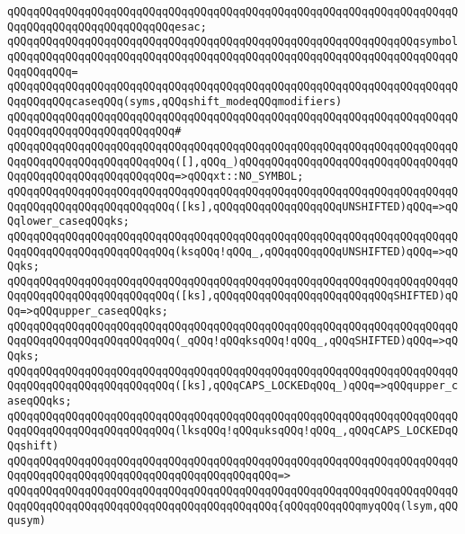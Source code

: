 \verb|qQQqqQQqqQQqqQQqqQQqqQQqqQQqqQQqqQQqqQQqqQQqqQQqqQQqqQQqqQQqqQQqqQQqqQQqqQQqqQQqqQQqqQQqqQQqqQQqesac;|\newline
\newline
\verb|qQQqqQQqqQQqqQQqqQQqqQQqqQQqqQQqqQQqqQQqqQQqqQQqqQQqqQQqqQQqqQQqsymbol|\newline
\verb|qQQqqQQqqQQqqQQqqQQqqQQqqQQqqQQqqQQqqQQqqQQqqQQqqQQqqQQqqQQqqQQqqQQqqQQqqQQqqQQq=|\newline
\verb|qQQqqQQqqQQqqQQqqQQqqQQqqQQqqQQqqQQqqQQqqQQqqQQqqQQqqQQqqQQqqQQqqQQqqQQqqQQqqQQqcaseqQQq(syms,qQQqshift_modeqQQqmodifiers)|\newline
\verb|qQQqqQQqqQQqqQQqqQQqqQQqqQQqqQQqqQQqqQQqqQQqqQQqqQQqqQQqqQQqqQQqqQQqqQQqqQQqqQQqqQQqqQQqqQQqqQQq#|\newline
\verb|qQQqqQQqqQQqqQQqqQQqqQQqqQQqqQQqqQQqqQQqqQQqqQQqqQQqqQQqqQQqqQQqqQQqqQQqqQQqqQQqqQQqqQQqqQQqqQQq([],qQQq_)qQQqqQQqqQQqqQQqqQQqqQQqqQQqqQQqqQQqqQQqqQQqqQQqqQQqqQQqqQQq=>qQQqxt::NO_SYMBOL;|\newline
\verb|qQQqqQQqqQQqqQQqqQQqqQQqqQQqqQQqqQQqqQQqqQQqqQQqqQQqqQQqqQQqqQQqqQQqqQQqqQQqqQQqqQQqqQQqqQQqqQQq([ks],qQQqqQQqqQQqqQQqqQQqUNSHIFTED)qQQq=>qQQqlower_caseqQQqks;|\newline
\verb|qQQqqQQqqQQqqQQqqQQqqQQqqQQqqQQqqQQqqQQqqQQqqQQqqQQqqQQqqQQqqQQqqQQqqQQqqQQqqQQqqQQqqQQqqQQqqQQq(ksqQQq!qQQq_,qQQqqQQqqQQqUNSHIFTED)qQQq=>qQQqks;|\newline
\verb|qQQqqQQqqQQqqQQqqQQqqQQqqQQqqQQqqQQqqQQqqQQqqQQqqQQqqQQqqQQqqQQqqQQqqQQqqQQqqQQqqQQqqQQqqQQqqQQq([ks],qQQqqQQqqQQqqQQqqQQqqQQqqQQqSHIFTED)qQQq=>qQQqupper_caseqQQqks;|\newline
\verb|qQQqqQQqqQQqqQQqqQQqqQQqqQQqqQQqqQQqqQQqqQQqqQQqqQQqqQQqqQQqqQQqqQQqqQQqqQQqqQQqqQQqqQQqqQQqqQQq(_qQQq!qQQqksqQQq!qQQq_,qQQqSHIFTED)qQQq=>qQQqks;|\newline
\verb|qQQqqQQqqQQqqQQqqQQqqQQqqQQqqQQqqQQqqQQqqQQqqQQqqQQqqQQqqQQqqQQqqQQqqQQqqQQqqQQqqQQqqQQqqQQqqQQq([ks],qQQqCAPS_LOCKEDqQQq_)qQQq=>qQQqupper_caseqQQqks;|\newline
\newline
\verb|qQQqqQQqqQQqqQQqqQQqqQQqqQQqqQQqqQQqqQQqqQQqqQQqqQQqqQQqqQQqqQQqqQQqqQQqqQQqqQQqqQQqqQQqqQQqqQQq(lksqQQq!qQQquksqQQq!qQQq_,qQQqCAPS_LOCKEDqQQqshift)|\newline
\verb|qQQqqQQqqQQqqQQqqQQqqQQqqQQqqQQqqQQqqQQqqQQqqQQqqQQqqQQqqQQqqQQqqQQqqQQqqQQqqQQqqQQqqQQqqQQqqQQqqQQqqQQqqQQqqQQq=>|\newline
\verb|qQQqqQQqqQQqqQQqqQQqqQQqqQQqqQQqqQQqqQQqqQQqqQQqqQQqqQQqqQQqqQQqqQQqqQQqqQQqqQQqqQQqqQQqqQQqqQQqqQQqqQQqqQQqqQQq{qQQqqQQqqQQqmyqQQq(lsym,qQQqusym)|\newline
